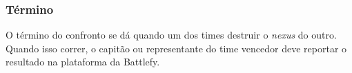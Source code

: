 \subsubsection{Término}

O término do confronto se dá quando um dos times destruir o \textit{nexus} do outro. Quando isso correr, o capitão ou representante do time vencedor deve reportar o resultado na plataforma da Battlefy.